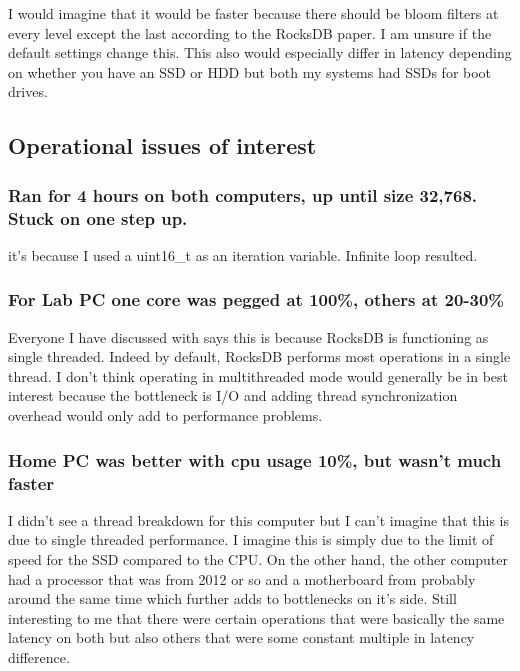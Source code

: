 \documentclass[11pt]{article}
\begin{document}
I would imagine that it would be faster because there should be bloom filters at
every level except the last according to the RocksDB paper. I am unsure if the
default settings change this. This also would especially differ in latency
depending on whether you have an SSD or HDD but both my systems had SSDs for
boot drives.

\subsection{Operational issues of interest}

\subsubsection{Ran for 4 hours on both computers, up until size 32,768. Stuck on
one step up.}

it's because I used a uint16\_t as an iteration variable. Infinite loop
resulted.

\subsubsection{For Lab PC one core was pegged at 100\%, others at 20-30\%}

Everyone I have discussed with says this is because RocksDB is functioning as
single threaded. Indeed by default, RocksDB performs most operations in a single
thread. I don't think operating in multithreaded mode would generally be in best
interest because the bottleneck is I/O and adding thread synchronization
overhead would only add to performance problems.

\subsubsection{Home PC was better with cpu usage 10\%, but wasn’t much faster}

I didn't see a thread breakdown for this computer but I can't imagine that
this is due to single threaded performance. I imagine this is simply due to the
limit of speed for the SSD compared to the CPU. On the other hand, the other
computer had a processor that was from 2012 or so and a motherboard from
probably around the same time which further adds to bottlenecks on it's side.
Still interesting to me that there were certain operations that were basically
the same latency on both but also others that were some constant multiple in
latency difference.
\end{document}
